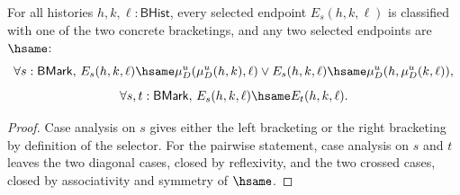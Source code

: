 \begin{theorem}
\label{thm:ratup-fieldup-bracketing-endpoint-selector-same}
For all histories $h,k,\ell:\mathsf{BHist}$, every selected endpoint
$E_s(h,k,\ell)$ is classified with one of the two concrete bracketings, and
any two selected endpoints are $\hsame$:
$$
\forall s:\mathsf{BMark},\,
E_s(h,k,\ell)\hsame \mu_D^u(\mu_D^u(h,k),\ell)
\vee
E_s(h,k,\ell)\hsame \mu_D^u(h,\mu_D^u(k,\ell)),
$$
$$
\forall s,t:\mathsf{BMark},\,
E_s(h,k,\ell)\hsame E_t(h,k,\ell).
$$
\end{theorem}
\begin{proof}
Case analysis on $s$ gives either the left bracketing or the right bracketing
by definition of the selector. For the pairwise statement, case analysis on
$s$ and $t$ leaves the two diagonal cases, closed by reflexivity, and the two
crossed cases, closed by associativity and symmetry of $\hsame$.
\end{proof}

